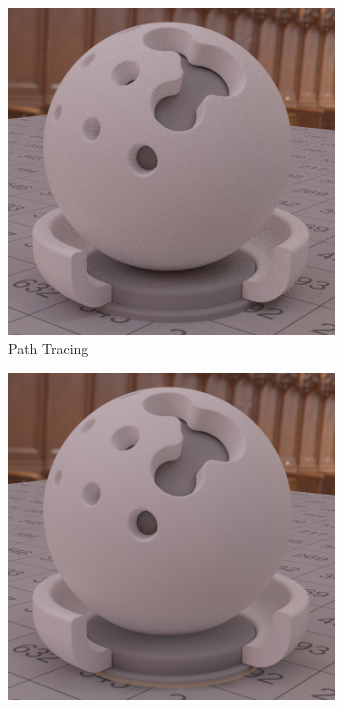 		\begin{figure}[h]
			\begin{subfigure}[t]{0.33\textwidth}
				\center
				\includegraphics[width=0.95\textwidth]{pic/irr_est-ra-shaderball4-ref.png}
				\caption{Path Tracing}
			\end{subfigure}
			\begin{subfigure}[t]{0.33\textwidth}
				\center
				\includegraphics[width=0.95\textwidth]{pic/irr_est-ra-shaderball4-irr.png}

\end{subfigure}
\end{figure}
